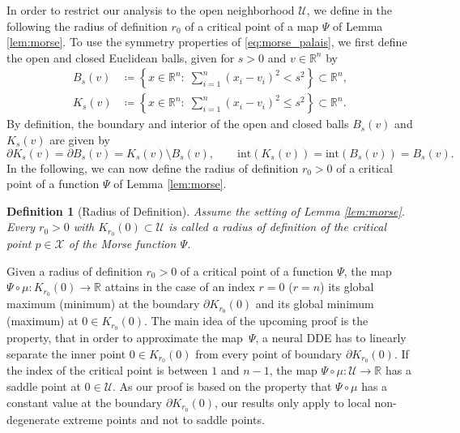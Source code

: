 \documentclass[10pt]{article}
\numberwithin{equation}{section}
\newtheorem{definition}[theorem]{Definition}
\begin{document}
	In order to restrict our analysis to the open neighborhood $\mathcal{U}$, we define in the following the radius of definition $r_0$ of a critical point of a map $\Psi$ of Lemma \ref{lem:morse}. To use the symmetry properties of \eqref{eq:morse_palais}, we first define the open and closed Euclidean balls, given for $s>0$ and $v \in \mathbb{R}^n$ by
	\begin{align*}
		B_{s}(v) &\coloneqq \left\{ x \in \mathbb{R}^n: \;  \sum_{i =1}^n (x_i-v_i)^2 < s^2 \right\} \subset \mathbb{R}^n, \\
		K_{s}(v) &\coloneqq \left\{ x \in \mathbb{R}^n: \; \sum_{i =1}^n (x_i-v_i)^2 \leq s^2 \right\} \subset \mathbb{R}^n. 
	\end{align*}
	By definition, the boundary and interior of the open and closed balls $B_{s}(v)$ and $K_{s}(v)$ are given by
	\begin{equation*}
		\partial K_{s}(v) = \partial B_{s}(v) = K_{s}(v) \setminus B_{s}(v), \qquad \text{int}(K_{s}(v)) = \text{int}(B_{s}(v)) = B_{s}(v).
	\end{equation*}
	In the following, we can now define the radius of definition $r_0>0$ of a critical point of a function $\Psi$ of Lemma \ref{lem:morse}.
	
	\begin{definition}[Radius of Definition]\label{def:radiusmorse}
		Assume the setting of Lemma \ref{lem:morse}. Every $r_0>0$ with  $K_{r_0}(0)\subset \mathcal{U}$ is called a radius of definition of the critical point $p \in \mathcal{X}$ of the Morse function $\Psi$. 
	\end{definition}
	
	Given a radius of definition $r_0>0$ of a critical point of a function $\Psi$, the map $\Psi \circ \mu: K_{r_0}(0)\rightarrow \mathbb{R}$ attains in the case of an index $r = 0$ ($r = n$) its global maximum (minimum) at the boundary $\partial  K_{r_0}(0)$ and its global minimum (maximum) at $0 \in K_{r_0}(0)$. The main idea of the upcoming proof is the property, that in order to approximate the map~$\Psi$, a neural DDE has to linearly separate the inner point $0 \in K_{r_0}(0)$ from every point of boundary $\partial  K_{r_0}(0)$. If the index of the critical point is between $1$ and $n-1$,  the map $\Psi\circ\mu:\mathcal{U}\rightarrow \mathbb{R}$ has a saddle point at $0\in\mathcal{U}$. As our proof is based on the property that $\Psi\circ\mu$ has a constant value at the boundary $\partial  K_{r_0}(0)$, our results only apply to local non-degenerate extreme points and not to saddle points.
	
\end{document}
